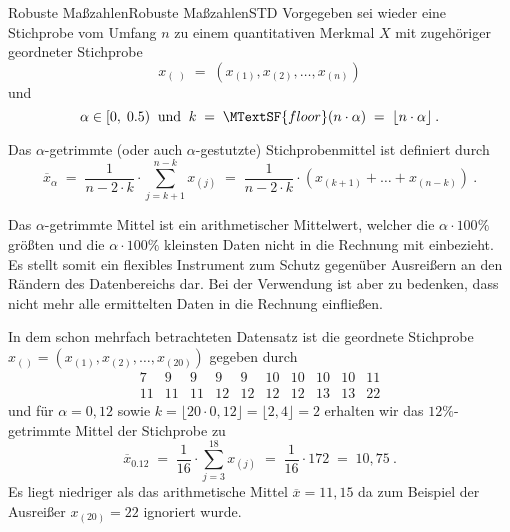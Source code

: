 \begin{MXContent}{Robuste Maßzahlen}{Robuste Maßzahlen}{STD}
Vorgegeben sei wieder eine Stichprobe vom Umfang $n$ zu einem quantitativen Merkmal $X$ mit 
zugehöriger geordneter Stichprobe
$$
x_{(\; )}\;=\;(x_{(1)},x_{(2)},\ldots ,x_{(n)})
$$
und
$$
\alpha \in [0,\;0.5)\;\; \text{und}\;\;k\;=\;\MTextSF{floor}(n\cdot \alpha) \;= \;\lfloor n\cdot \alpha \rfloor \: .
$$

\begin{MInfo}
Das $\alpha$-getrimmte (oder auch $\alpha$-gestutzte) Stichprobenmittel ist definiert durch
$$
\overline{x}_{\alpha}\;=\;
\frac{1}{n-2\cdot k} \cdot \sum\limits_{j=k+1}^{n-k}x_{(j)}\;=\; \frac{1}{n-2\cdot k}\cdot \left(x_{(k+1)}+ \ldots + x_{(n-k)} \right)\: .
$$
\end{MInfo}

Das $\alpha$-getrimmte Mittel ist ein arithmetischer Mittelwert, welcher die $\alpha \cdot 100\%$ größten und die $\alpha \cdot 100\%$ kleinsten Daten nicht in
die Rechnung mit einbezieht. Es stellt somit ein flexibles Instrument zum Schutz gegenüber Ausreißern an den Rändern des Datenbereichs dar.
Bei der Verwendung ist aber zu bedenken, dass nicht mehr alle ermittelten Daten in die Rechnung einfließen.

\begin{MExample}
In dem schon mehrfach betrachteten Datensatz ist die geordnete Stichprobe $x_{()}=(x_{(1)},x_{(2)},\ldots ,x_{(20)})$ gegeben durch
$$
\begin{array}{cccccccccc} 7 & 9 & 9 & 9 & 9 & 10 & 10 & 10 & 10 & 11 \\ 11 & 11 & 11 & 12 & 12 & 12 & 12 & 13 & 13 & 22 \end{array}
$$
und für
$\alpha = 0,12$ sowie $k=\lfloor 20\cdot 0,12 \rfloor = \lfloor 2,4 \rfloor =2$ erhalten wir das $12\%$-getrimmte Mittel der Stichprobe zu
$$
\overline{x}_{0.12} \;=\; \frac{1}{16}\cdot \sum\limits_{j=3}^{18}x_{(j)}\;=\; \frac{1}{16}\cdot 172\;=\;10,75\: .
$$
Es liegt niedriger als das arithmetische Mittel $\overline{x}=11,15$ da zum Beispiel der Ausreißer $x_{(20)}=22$ ignoriert wurde.
\end{MExample}

\end{MXContent}

